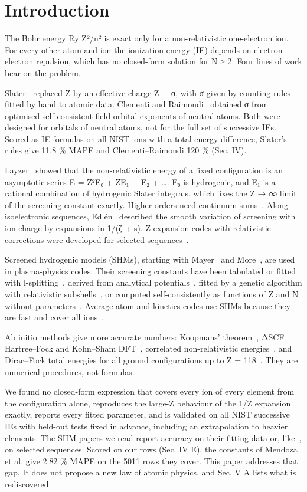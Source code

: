 \documentclass[aps,pra,preprint,superscriptaddress,amsmath,amssymb]{revtex4-2}
\begin{document}
\section{Introduction}

The Bohr energy Ry Z²/n² is exact only for a non-relativistic one-electron ion. For every other atom and ion the ionization energy (IE) depends on electron–electron repulsion, which has no closed-form solution for N ≥ 2. Four lines of work bear on the problem.


Slater~\cite{r1} replaced Z by an effective charge Z − σ, with σ given by counting rules fitted by hand to atomic data. Clementi and Raimondi~\cite{r2,r3} obtained σ from optimised self-consistent-field orbital exponents of neutral atoms. Both were designed for orbitals of neutral atoms, not for the full set of successive IEs. Scored as IE formulas on all NIST ions with a total-energy difference, Slater's rules give 11.8 \% MAPE and Clementi–Raimondi 120 \% (Sec. IV).


Layzer~\cite{r4,r5} showed that the non-relativistic energy of a fixed configuration is an asymptotic series E = Z²E₀ + ZE₁ + E₂ + …. E₀ is hydrogenic, and E₁ is a rational combination of hydrogenic Slater integrals, which fixes the Z → ∞ limit of the screening constant exactly. Higher orders need continuum sums~\cite{r6,r7}. Along isoelectronic sequences, Edlén~\cite{r8} described the smooth variation of screening with ion charge by expansions in 1/(ζ + s). Z-expansion codes with relativistic corrections were developed for selected sequences~\cite{r9}.


Screened hydrogenic models (SHMs), starting with Mayer~\cite{r10} and More~\cite{r11}, are used in plasma-physics codes. Their screening constants have been tabulated or fitted with l-splitting~\cite{r12,r13}, derived from analytical potentials~\cite{r14,r15}, fitted by a genetic algorithm with relativistic subshells~\cite{r16}, or computed self-consistently as functions of Z and N without parameters~\cite{r17,r18,r19,r20,r21,r22}. Average-atom and kinetics codes use SHMs because they are fast and cover all ions~\cite{r23,r24,r25}.


Ab initio methods give more accurate numbers: Koopmans' theorem~\cite{r26}, ΔSCF Hartree–Fock and Kohn–Sham DFT~\cite{r27,r28}, correlated non-relativistic energies~\cite{r29}, and Dirac–Fock total energies for all ground configurations up to Z = 118~\cite{r30}. They are numerical procedures, not formulas.


We found no closed-form expression that covers every ion of every element from the configuration alone, reproduces the large-Z behaviour of the 1/Z expansion exactly, reports every fitted parameter, and is validated on all NIST successive IEs with held-out tests fixed in advance, including an extrapolation to heavier elements. The SHM papers we read report accuracy on their fitting data or, like~\cite{r20}, on selected sequences. Scored on our rows (Sec. IV E), the constants of Mendoza et al. give 2.82 \% MAPE on the 5011 rows they cover. This paper addresses that gap. It does not propose a new law of atomic physics, and Sec. V A lists what is rediscovered.
\end{document}
